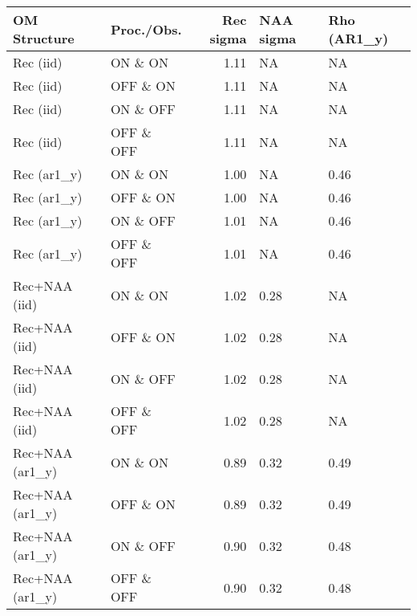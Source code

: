 \begin{table}[H]
    \centering
    \begin{tabular}{llrll}
        \toprule
         OM Structure & Proc./Obs. & Rec sigma & NAA sigma & Rho (AR1\_y) \\
        \midrule
        Rec (iid)       & ON \& ON   & 1.11 & NA & NA \\
        Rec (iid)       & OFF \& ON  & 1.11 & NA & NA \\
        Rec (iid)       & ON \& OFF  & 1.11 & NA & NA \\
        Rec (iid)       & OFF \& OFF & 1.11 & NA & NA \\
        Rec (ar1\_y)    & ON \& ON   & 1.00 & NA & 0.46 \\
        Rec (ar1\_y)    & OFF \& ON  & 1.00 & NA & 0.46 \\
        Rec (ar1\_y)    & ON \& OFF  & 1.01 & NA & 0.46 \\
        Rec (ar1\_y)    & OFF \& OFF & 1.01 & NA & 0.46 \\
        Rec+NAA (iid)     & ON \& ON   & 1.02 & 0.28 & NA \\
        Rec+NAA (iid)     & OFF \& ON  & 1.02 & 0.28 & NA \\
        Rec+NAA (iid)     & ON \& OFF  & 1.02 & 0.28 & NA \\
        Rec+NAA (iid)     & OFF \& OFF & 1.02 & 0.28 & NA \\
        Rec+NAA (ar1\_y)  & ON \& ON   & 0.89 & 0.32 & 0.49 \\
        Rec+NAA (ar1\_y)  & OFF \& ON  & 0.89 & 0.32 & 0.49 \\
        Rec+NAA (ar1\_y)  & ON \& OFF  & 0.90 & 0.32 & 0.48 \\
        Rec+NAA (ar1\_y)  & OFF \& OFF & 0.90 & 0.32 & 0.48 \\
        \bottomrule
    \end{tabular}
\end{table}

